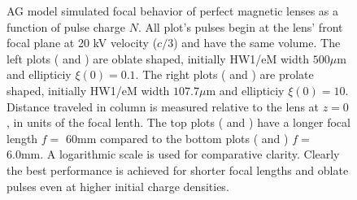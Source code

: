 
\begin{figure}
  \centering
  \centerline{
  }
  \centerline{
  }
  \caption[AG model simulated focal behavior of perfect magnetic lenses as a function of pulse charge $N$]{
    AG model simulated focal behavior of perfect magnetic lenses as a function of pulse charge $N$.
    All plot's pulses begin at the lens' front focal plane at 20 kV velocity ($c/3$) and have the same volume.
    The left plots ( and ) are oblate shaped, initially HW1/eM width $ 500 \mu \text{m}$ and ellipticiy $ \xi ( 0 ) = 0.1 $.
    The right plots ( and ) are prolate shaped, initially HW1/eM width $ 107.7 \mu \text{m}$ and ellipticiy $ \xi ( 0 ) = 10 $.
    Distance traveled in column is measured relative to the lens at $z=0$, in units of the focal lenth.
    The top plots ( and ) have a longer focal length $f = $ 60mm compared to the bottom plots ( and ) $ f = $ 6.0mm.
    A logarithmic scale is used for comparative clarity.
    Clearly the best performance is achieved for shorter focal lengths and oblate pulses even at higher initial charge densities.
  }
  \label{fig:focus_lens_charge}
\end{figure}
